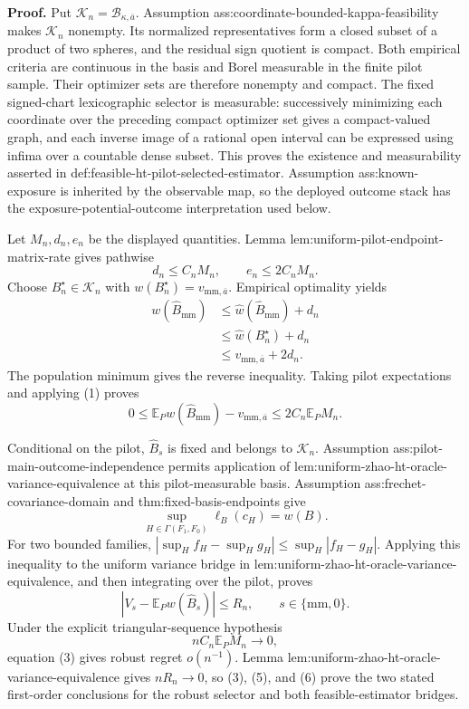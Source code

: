 \textbf{Proof.}
Put \(\mathcal K_n=\mathcal B_{\kappa,\overline a}\).  Assumption ass:coordinate-bounded-kappa-feasibility makes \(\mathcal K_n\) nonempty.  Its normalized representatives form a closed subset of a product of two spheres, and the residual sign quotient is compact.  Both empirical criteria are continuous in the basis and Borel measurable in the finite pilot sample.  Their optimizer sets are therefore nonempty and compact.  The fixed signed-chart lexicographic selector is measurable: successively minimizing each coordinate over the preceding compact optimizer set gives a compact-valued graph, and each inverse image of a rational open interval can be expressed using infima over a countable dense subset.  This proves the existence and measurability asserted in def:feasible-ht-pilot-selected-estimator.  Assumption ass:known-exposure is inherited by the observable map, so the deployed outcome stack has the exposure-potential-outcome interpretation used below.

Let \(M_n,d_n,e_n\) be the displayed quantities.  Lemma lem:uniform-pilot-endpoint-matrix-rate gives pathwise
\[
d_n\le C_nM_n,
\qquad
e_n\le2C_nM_n.
\tag{1}
\]
Choose \(B_n^\star\in\mathcal K_n\) with \(w(B_n^\star)=v_{\mathrm{mm},\overline a}\).  Empirical optimality yields
\[
\begin{aligned}
w(\widehat B_{\mathrm{mm}})
&\le\widehat w(\widehat B_{\mathrm{mm}})+d_n\\
&\le\widehat w(B_n^\star)+d_n\\
&\le v_{\mathrm{mm},\overline a}+2d_n.
\end{aligned}
\tag{2}
\]
The population minimum gives the reverse inequality.  Taking pilot expectations and applying (1) proves
\[
0\le\mathbb E_Pw(\widehat B_{\mathrm{mm}})-v_{\mathrm{mm},\overline a}
\le2C_n\mathbb E_PM_n.
\tag{3}
\]

Conditional on the pilot, \(\widehat B_s\) is fixed and belongs to \(\mathcal K_n\).  Assumption ass:pilot-main-outcome-independence permits application of lem:uniform-zhao-ht-oracle-variance-equivalence at this pilot-measurable basis.  Assumption ass:frechet-covariance-domain and thm:fixed-basis-endpoints give
\[
\sup_{H\in\Gamma(F_1,F_0)}\ell_B(c_H)=w(B).
\tag{4}
\]
For two bounded families, \(|\sup_Hf_H-\sup_Hg_H|\le\sup_H|f_H-g_H|\).  Applying this inequality to the uniform variance bridge in lem:uniform-zhao-ht-oracle-variance-equivalence, and then integrating over the pilot, proves
\[
|V_s-\mathbb E_Pw(\widehat B_s)|\le R_n,
\qquad s\in\{\mathrm{mm},0\}.
\tag{5}
\]
Under the explicit triangular-sequence hypothesis
\[
nC_n\mathbb E_PM_n\longrightarrow0,
\tag{6}
\]
equation (3) gives robust regret \(o(n^{-1})\).  Lemma lem:uniform-zhao-ht-oracle-variance-equivalence gives \(nR_n\to0\), so (3), (5), and (6) prove the two stated first-order conclusions for the robust selector and both feasible-estimator bridges.

